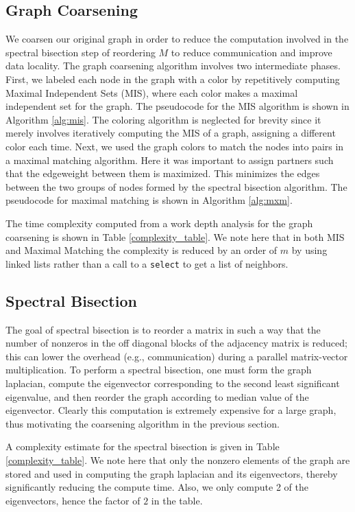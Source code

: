 \documentclass[11pt]{article}
\begin{document}
\subsection{Graph Coarsening}

We coarsen our original graph in order to reduce the computation involved in
the spectral bisection step of reordering $M$ to reduce communication and improve data
locality.
The graph coarsening algorithm involves two intermediate phases. First, we
labeled each node in the graph with a color by repetitively computing Maximal
Independent Sets (MIS), where each color makes a maximal independent set for the
graph. The pseudocode for the MIS algorithm is shown in
Algorithm \ref{alg:mis}. The coloring algorithm is neglected for brevity since
it merely involves iteratively computing the MIS of a graph, assigning a
different color each time. Next, we used the
graph colors to match the nodes into pairs in a maximal matching algorithm. Here
it was important to assign partners such that the edgeweight between them is
maximized. This minimizes the edges between the two groups of nodes formed
by the spectral bisection algorithm. The pseudocode for maximal matching is
shown in Algorithm \ref{alg:mxm}. 

The time complexity computed from a work depth analysis for the graph coarsening is shown in Table
\ref{complexity_table}. We note here that in both MIS and Maximal Matching the
complexity is reduced by an order of $m$ by using linked lists rather than
a call to a \texttt{select} to get a list of neighbors. 

\subsection{Spectral Bisection}

The goal of spectral bisection is to reorder a matrix in such a way that the
number of nonzeros in the off diagonal blocks of the adjacency matrix is
reduced; this can lower the overhead (e.g., communication) during a parallel
matrix-vector multiplication. To perform a spectral bisection, one must form the
graph laplacian, compute the eigenvector corresponding to the second least significant
eigenvalue, and then reorder the graph according to median value of the
eigenvector. Clearly this computation is extremely expensive for a large
graph, thus motivating the coarsening algorithm in the previous section. 

A complexity estimate for the spectral bisection is given in Table
\ref{complexity_table}. We note here that only the nonzero elements of the graph
are stored and used in computing the graph laplacian and its eigenvectors, thereby significantly
reducing the compute time. Also, we only compute 2 of the eigenvectors, hence
the factor of $2$ in the table. 
\end{document}
